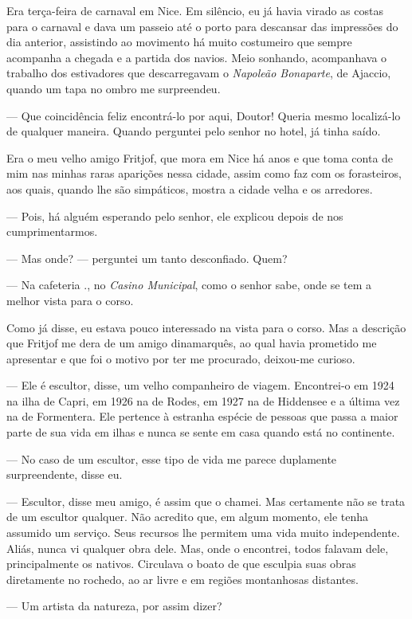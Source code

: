 Era terça-feira de carnaval em Nice. Em silêncio, eu já havia virado as
costas para o carnaval e dava um passeio até o porto para descansar das
impressões do dia anterior, assistindo ao movimento há muito costumeiro
que sempre acompanha a chegada e a partida dos navios. Meio sonhando,
acompanhava o trabalho dos estivadores que descarregavam o
\emph{Napoleão Bonaparte}, de Ajaccio, quando um tapa no ombro me
surpreendeu.

--- Que coincidência feliz encontrá-lo por aqui, Doutor! Queria mesmo
localizá-lo de qualquer maneira. Quando perguntei pelo senhor no hotel,
já tinha saído.

Era o meu velho amigo Fritjof, que mora em Nice há anos e que toma conta
de mim nas minhas raras aparições nessa cidade, assim como faz com os
forasteiros, aos quais, quando lhe são simpáticos, mostra a cidade velha
e os arredores.

--- Pois, há alguém esperando pelo senhor, ele explicou depois de nos
cumprimentarmos.

--- Mas onde? --- perguntei um tanto desconfiado. Quem?

--- Na cafeteria ., no \emph{Casino Municipal}, como o senhor sabe, onde
se tem a melhor vista para o corso.

Como já disse, eu estava pouco interessado na vista para o corso. Mas a
descrição que Fritjof me dera de um amigo dinamarquês, ao qual havia
prometido me apresentar e que foi o motivo por ter me procurado,
deixou-me curioso.

--- Ele é escultor, disse, um velho companheiro de viagem. Encontrei-o em
1924 na ilha de Capri, em 1926 na de Rodes, em 1927 na de Hiddensee e a
última vez na de Formentera. Ele pertence à estranha espécie de pessoas
que passa a maior parte de sua vida em ilhas e nunca se sente em casa
quando está no continente.

--- No caso de um escultor, esse tipo de vida me parece duplamente
surpreendente, disse eu.

--- Escultor, disse meu amigo, é assim que o chamei. Mas certamente não
se trata de um escultor qualquer. Não acredito que, em algum momento,
ele tenha assumido um serviço. Seus recursos lhe permitem uma vida muito
independente. Aliás, nunca vi qualquer obra dele. Mas, onde o encontrei,
todos falavam dele, principalmente os nativos. Circulava o boato de que
esculpia suas obras diretamente no rochedo, ao ar livre e em regiões
montanhosas distantes.

--- Um artista da natureza, por assim dizer?

